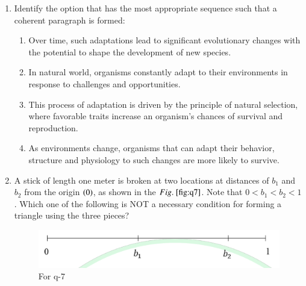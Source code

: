 \documentclass[journal,12pt,onecolumn]{IEEEtran}
\theoremstyle{remark}
\begin{document}
\begin{enumerate}
\item Identify the option that has the most appropriate sequence such that a coherent paragraph is formed: \\
\begin{enumerate}[start=16,label=\Alph*.]
    \item Over time, such adaptations lead to significant evolutionary changes with the potential to shape the development of new species.
    \item In natural world, organisms constantly adapt to their environments in response to challenges and opportunities.
    \item This process of adaptation is driven by the principle of natural selection, where favorable traits increase an organism's chances of survival and reproduction.
    \item As environments change, organisms that can adapt their behavior, structure and physiology to such changes are more likely to survive.
\end{enumerate}

\hfill{}

\begin{enumerate}
\end{enumerate}

\item A stick of length one meter is broken at two locations at distances of $b_{1}$ and $b_{2}$ from the origin $\left(0\right)$, as shown in the $\figref{fig:q7}$. Note that $0<b_{1}<b_{2}<1$. Which one of the following is NOT a necessary condition for forming a triangle using the three pieces?
\begin{figure}[H]
\centering
\includegraphics[width=0.7\columnwidth]{q7}
\caption{For q-7}
\label{fig:q7}
\end{figure}

\hfill{}


\end{enumerate}
\end{document}
